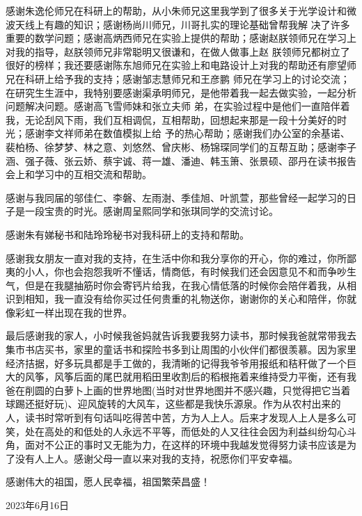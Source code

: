 \begin{acknowledgements}
感谢朱逸伦师兄在科研上的帮助，从小朱师兄这里我学到了很多关于光学设计和微波天线上有趣的知识；感谢杨尚川师兄，川哥扎实的理论基础曾帮我解
决了许多重要的数学问题；感谢高炳西师兄在实验上提供的帮助；感谢赵朕领师兄在学习上对我的指导，赵朕领师兄非常聪明又很谦和，在做人做事上赵
朕领师兄都树立了很好的榜样；我还要感谢陈东旭师兄在实验上和电路设计上对我的帮助还有廖望师兄在科研上给予我的支持；感谢邹志慧师兄和王彦鹏
师兄在学习上的讨论交流；在研究生生涯中，我特别要感谢渠承明师兄，是他带着我一起去做实验，一起分析问题解决问题。感谢高飞雪师妹和张立夫师
弟，在实验过程中是他们一直陪伴着我，无论刮风下雨，我们互相调侃，互相帮助，回想起来那是一段十分美好的时光；感谢李文祥师弟在数值模拟上给
予的热心帮助；感谢我们办公室的余基诺、裴柏杨、徐梦梦、林之意、刘悠然、曾庆彬、杨锦琛同学们的互帮互助；感谢李子涵、强子薇、张云娇、蔡宇诚、蒋一雄、潘迪、韩玉箫、张景硕、邵丹在读书报告会上和学习中的互相交流和帮助。

感谢与我同届的邬佳仁、李磐、左雨澍、季佳旭、叶凯萱，那些曾经一起学习的日子是一段宝贵的时光。感谢周呈熙同学和张琪同学的交流讨论。

感谢朱有娣秘书和陆玲玲秘书对我科研上的支持和帮助。


感谢我女朋友一直对我的支持，在生活中你和我分享你的开心，你的难过，你所鄙夷的小人，你也会抱怨我听不懂话，情商低，有时候我们还会因意见不和而争吵生气，但是在我腿抽筋时你会寄钙片给我，在我心情低落的时候你会陪伴着我，从相识到相知，我一直没有给你买过任何贵重的礼物送你，谢谢你的关心和陪伴，你就像彩虹一样出现在我的世界。

最后感谢我的家人，小时候我爸妈就告诉我要我努力读书，那时候我爸就常带我去集市书店买书，家里的童话书和探险书多到让周围的小伙伴们都很羡慕。因为家里经济拮据，好多玩具都是手工做的，我清晰的记得我爷爷用报纸和秸秆做了一个巨大的风筝，风筝后面的尾巴就用稻田里收割后的稻根拖着来维持受力平衡，还有我爸在削圆的白萝卜上画的世界地图(当时对世界地图并不感兴趣，只觉得把它当着球踢还挺好玩)、迎风旋转的大风车，这些都是我快乐源泉。作为从农村出来的人，读书时常听到有句话叫吃得苦中苦，方为人上人。后来才发现人上人是多么可笑，处在高处的和低处的人永远不平等，而低处的人又往往会因为利益纠纷勾心斗角，面对不公正的事时又无能为力，在这样的环境中我越发觉得努力读书应该是为了没有人上人。感谢父母一直以来对我的支持，祝愿你们平安幸福。

感谢伟大的祖国，愿人民幸福，祖国繁荣昌盛！

\hfill 2023年6月16日

\end{acknowledgements}

























